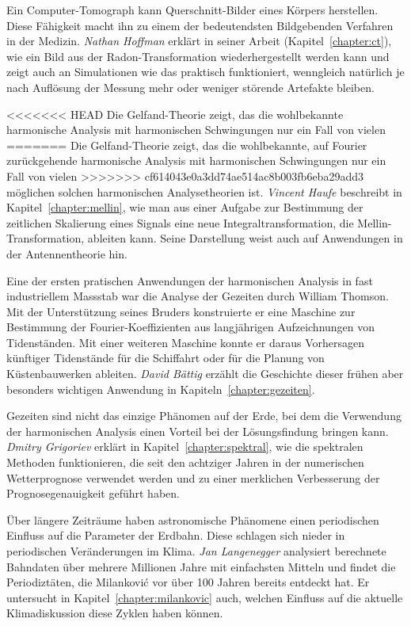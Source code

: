 Ein Computer-Tomograph kann Querschnitt-Bilder eines Körpers
herstellen.
%
Diese Fähigkeit macht ihn zu einem der bedeutendsten Bildgebenden
Verfahren in der Medizin.
{\em Nathan Hoffman} erklärt in seiner Arbeit (Kapitel~\ref{chapter:ct}),
%
wie ein Bild aus der
Radon-Transformation wiederhergestellt werden kann und zeigt auch
%
an Simulationen wie das praktisch funktioniert, wenngleich natürlich
je nach Auflösung der Messung mehr oder weniger störende Artefakte bleiben.

<<<<<<< HEAD
Die Gelfand-Theorie zeigt, das die wohlbekannte harmonische
%
Analysis mit harmonischen Schwingungen nur ein Fall von vielen
=======
Die Gelfand-Theorie zeigt, das die wohlbekannte, auf Fourier zurückgehende
harmonische Analysis mit harmonischen Schwingungen nur ein Fall von vielen
>>>>>>> cf614043e0a3dd74ae514ac8b003fb6eba29add3
möglichen solchen harmonischen Analysetheorien ist.
{\em Vincent Haufe} beschreibt in Kapitel~\ref{chapter:mellin},
%
wie man aus einer Aufgabe
zur Bestimmung der zeitlichen Skalierung eines Signals eine
neue Integraltransformation, die Mellin-Transformation, ableiten 
%
kann.
Seine Darstellung weist auch auf Anwendungen in der Antennentheorie
hin.

Eine der ersten pratischen Anwendungen der harmonischen Analysis in
fast industriellem Massstab war die Analyse der Gezeiten durch
William Thomson.
Mit der Unterstützung seines Bruders konstruierte er eine Maschine zur
Bestimmung der Fourier-Koeffizienten aus langjährigen Aufzeichnungen
von Tidenständen.
Mit einer weiteren Maschine konnte er daraus Vorhersagen künftiger
Tidenstände für die Schiffahrt oder für die Planung von Küstenbauwerken
ableiten.
{\em David Bättig} erzählt die Geschichte dieser frühen aber besonders
wichtigen Anwendung in Kapiteln~\ref{chapter:gezeiten}.
%
%

Gezeiten sind nicht das einzige Phänomen auf der Erde, bei dem die
Verwendung der harmonischen Analysis einen Vorteil bei der Lösungsfindung
bringen kann.
{\em Dmitry Grigoriev} erklärt in Kapitel~\ref{chapter:spektral},
%
wie die spektralen Methoden funktionieren, die seit den achtziger Jahren
in der numerischen Wetterprognose verwendet werden und zu einer
merklichen Verbesserung der Prognosegenauigkeit geführt haben.

Über längere Zeiträume haben astronomische Phänomene einen periodischen
Einfluss auf die Parameter der Erdbahn.
Diese schlagen sich nieder in periodischen Veränderungen im Klima.
{\em Jan Langenegger} analysiert berechnete Bahndaten über mehrere
%
Millionen Jahre mit einfachsten Mitteln und findet die Periodiztäten,
die Milankovi\'c vor über 100 Jahren bereits entdeckt hat.
Er untersucht in Kapitel~\ref{chapter:milankovic} auch, welchen Einfluss
auf die aktuelle Klimadiskussion diese Zyklen haben können.

